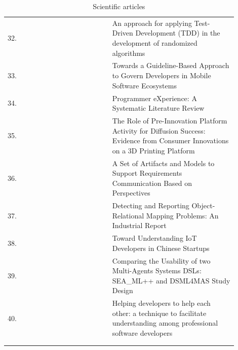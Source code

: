 \documentclass[english, 12pt, a4paper, sci, utf8, a-1b, online]{aaltothesis}
\begin{document}
\begin{center}
\begin{longtable}{p{0.05\linewidth}p{0.35\linewidth}p{0.5\linewidth}}
    32. & \textcite{ivo2018approach}                            & An approach for applying Test-Driven Development (TDD) in the development of randomized algorithms                                          \\
    33. & \textcite{de2017towards}                              & Towards a Guideline-Based Approach to Govern Developers in Mobile Software Ecosystems                                                       \\
    34. & \textcite{programmer-experience}                      & Programmer eXperience: A Systematic Literature Review                                                                                       \\
    35. & \textcite{claussen2019role}                           & The Role of Pre-Innovation Platform Activity for Diffusion Success: Evidence from Consumer Innovations on a 3D Printing Platform            \\
    36. & \textcite{oran2017set}                                & A Set of Artifacts and Models to Support Requirements Communication Based on Perspectives                                                   \\
    37. & \textcite{nazariodetecting}                           & Detecting and Reporting Object-Relational Mapping Problems: An Industrial Report                                                            \\
    38. & \textcite{zhang2018toward}                            & Toward Understanding IoT Developers in Chinese Startups                                                                                     \\
    39. & \textcite{silva-comparing}                            & Comparing the Usability of two Multi-Agents Systems DSLs: SEA\_ML++ and DSML4MAS Study Design                                               \\
    40. & \textcite{ollis2019helping}                           & Helping developers to help each other: a technique to facilitate understanding among professional software developers                       \\
    \captionsetup{width=0.6\textwidth}                                                                                                                                                                        \\
    \caption{Scientific articles}                                                                                                                                                                             \\
  \end{longtable}
\end{center}
\end{document}
